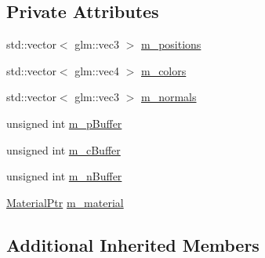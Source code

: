 \subsection*{Private Attributes}
\begin{DoxyCompactItemize}
\item 
std\+::vector$<$ glm\+::vec3 $>$ \hyperlink{classLightedCubeRenderable_a0c0c5eb370f23cabfd1a683d784559af}{m\+\_\+positions}
\item 
std\+::vector$<$ glm\+::vec4 $>$ \hyperlink{classLightedCubeRenderable_a8d300c68f52441ea4b0b8633cdb80a2c}{m\+\_\+colors}
\item 
std\+::vector$<$ glm\+::vec3 $>$ \hyperlink{classLightedCubeRenderable_af2d85e3194b02e6f94004f0cd08195f9}{m\+\_\+normals}
\item 
unsigned int \hyperlink{classLightedCubeRenderable_a9454b080496e7ceb563615c1fa14be9b}{m\+\_\+p\+Buffer}
\item 
unsigned int \hyperlink{classLightedCubeRenderable_aab6ae791b76f419fc6f0255718cc3ab1}{m\+\_\+c\+Buffer}
\item 
unsigned int \hyperlink{classLightedCubeRenderable_a65b42742eca437c5d84b75137abafbd7}{m\+\_\+n\+Buffer}
\item 
\hyperlink{Material_8hpp_a1d47cd05ca683e287435cf0b363fbfe1}{Material\+Ptr} \hyperlink{classLightedCubeRenderable_a06c8156cc469df88e25ee2cdeb00fa4a}{m\+\_\+material}
\end{DoxyCompactItemize}
\subsection*{Additional Inherited Members}


